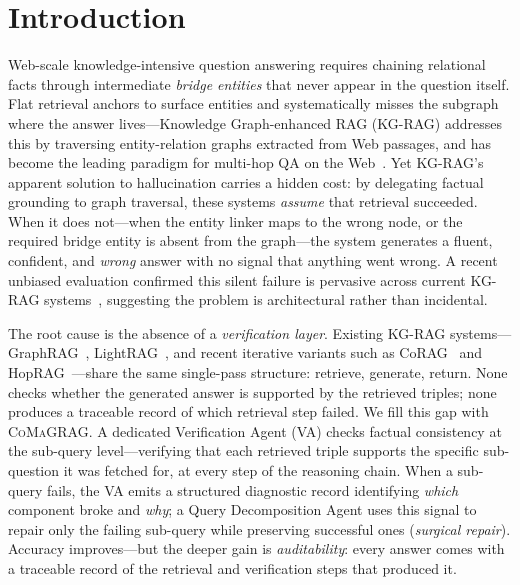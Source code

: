 \documentclass[runningheads]{llncs}
\newcommand{\sys}{\textsc{CoMaGRAG}\xspace}
\begin{document}
\section{Introduction}
\label{sec:intro}

Web-scale knowledge-intensive question answering requires chaining relational
facts through intermediate \emph{bridge entities} that never appear in the
question itself. Flat retrieval anchors to surface entities and systematically
misses the subgraph where the answer lives---Knowledge Graph-enhanced RAG
(KG-RAG) addresses this by traversing entity-relation graphs extracted from
Web passages, and has become the leading paradigm for multi-hop QA on the
Web~\cite{edge2024graphrag,guo2024lightrag}. Yet KG-RAG's apparent solution
to hallucination carries a hidden cost: by delegating factual grounding to
graph traversal, these systems \emph{assume} that retrieval succeeded. When
it does not---when the entity linker maps to the wrong node, or the required
bridge entity is absent from the graph---the system generates a fluent,
confident, and \emph{wrong} answer with no signal that anything went wrong.
A recent unbiased evaluation confirmed this silent failure is pervasive across
current KG-RAG systems~\cite{huang2025unbiased}, suggesting the problem is
architectural rather than incidental.

The root cause is the absence of a \emph{verification layer}. Existing
KG-RAG systems---GraphRAG~\cite{edge2024graphrag},
LightRAG~\cite{guo2024lightrag}, and recent iterative variants such as
CoRAG~\cite{lyu2025corag} and HopRAG~\cite{yu2025hoprag}---share the same
single-pass structure: retrieve, generate, return. None checks whether the
generated answer is supported by the retrieved triples; none produces a
traceable record of which retrieval step failed. We fill this gap with \sys.
A dedicated Verification Agent (VA) checks factual consistency at the
sub-query level---verifying that each retrieved triple supports the specific
sub-question it was fetched for, at every step of the reasoning chain. When
a sub-query fails, the VA emits a structured diagnostic record identifying
\emph{which} component broke and \emph{why}; a Query Decomposition Agent uses
this signal to repair only the failing sub-query while preserving successful
ones (\emph{surgical repair}). Accuracy improves---but the deeper gain is
\emph{auditability}: every answer comes with a traceable record of the
retrieval and verification steps that produced it.
\end{document}

